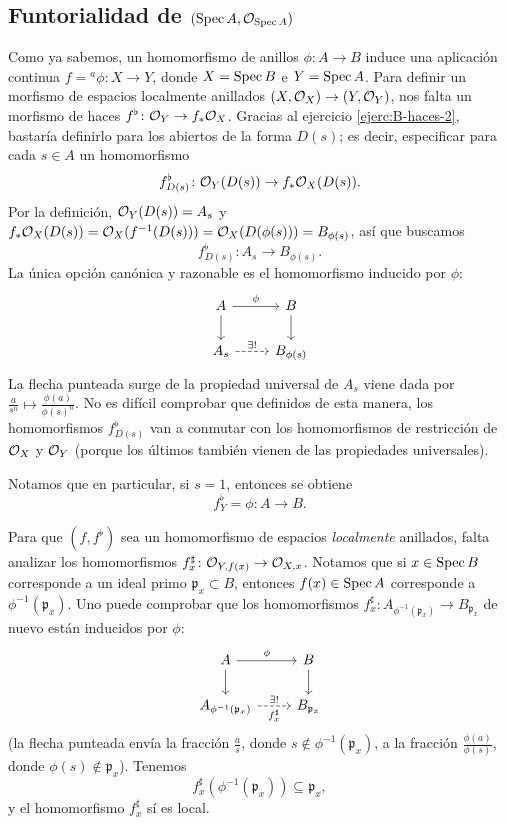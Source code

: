 \documentclass{article}
\numberwithin{equation}{section}
\theoremstyle{definition}
\begin{document}
\subsection{Funtorialidad de $(\operatorname{Spec} A, \mathcal{O}_{\operatorname{Spec} A})$}

Como ya sabemos, un homomorfismo de anillos $\phi\colon A\to B$ induce una
aplicación continua $f = {}^a \phi\colon X\to Y$, donde $X = \operatorname{Spec} B$ e
$Y = \operatorname{Spec} A$. Para definir un morfismo de espacios localmente anillados
$(X,\mathcal{O}_X) \to (Y,\mathcal{O}_Y)$, nos falta un morfismo de haces
$f^\flat\colon \mathcal{O}_Y \to f_* \mathcal{O}_X$. Gracias al ejercicio \ref{ejerc:B-haces-2},
bastaría definirlo para los abiertos de la forma $D (s)$; es decir, especificar
para cada $s \in A$ un homomorfismo
$$f^\flat_{D (s)}\colon \mathcal{O}_Y (D (s)) \to f_* \mathcal{O}_X (D (s)).$$
Por la definición, $\mathcal{O}_Y (D (s)) = A_s$ y
$f_* \mathcal{O}_X (D (s)) = \mathcal{O}_X (f^{-1} (D (s))) = \mathcal{O}_X (D (\phi (s))) = B_{\phi (s)}$,
así que buscamos
$$f^\flat_{D (s)}\colon A_s \to B_{\phi (s)}.$$
La única opción canónica y razonable es el homomorfismo inducido por $\phi$:
\[ \begin{tikzcd}
    A \ar{r}{\phi}\ar{d} & B\ar{d} \\
    A_s \ar[dashed]{r}{\exists!} & B_{\phi (s)}
\end{tikzcd} \]
La flecha punteada surge de la propiedad universal de $A_s$ viene dada por
$\frac{a}{s^n} \mapsto \frac{\phi (a)}{\phi (s)^n}$. No es difícil comprobar
que definidos de esta manera, los homomorfismos $f^\flat_{D (s)}$ van a conmutar
con los homomorfismos de restricción de $\mathcal{O}_X$ y $\mathcal{O}_Y$ (porque los últimos
también vienen de las propiedades universales).

Notamos que en particular, si $s = 1$, entonces se obtiene
\begin{equation}
  \label{eqn:secciones-globales-morfismo}
  f^\flat_Y = \phi\colon A \to B.
\end{equation}

Para que $(f,f^\flat)$ sea un homomorfismo de espacios \emph{localmente}
anillados, falta analizar los homomorfismos
$f^\sharp_x\colon \mathcal{O}_{Y,f(x)} \to \mathcal{O}_{X,x}$. Notamos que si $x \in \operatorname{Spec} B$
corresponde a un ideal primo $\mathfrak{p}_x \subset B$, entonces
$f (x) \in \operatorname{Spec} A$ corresponde a $\phi^{-1} (\mathfrak{p}_x)$. Uno puede
comprobar que los homomorfismos
$f^\sharp_x\colon A_{\phi^{-1} (\mathfrak{p}_x)} \to B_{\mathfrak{p}_x}$
de nuevo están inducidos por $\phi$:
\[ \begin{tikzcd}
    A \ar{r}{\phi}\ar{d} & B\ar{d} \\
    A_{\phi^{-1} (\mathfrak{p}_x)} \ar[dashed]{r}{\exists!}[swap]{f^\sharp_x} & B_{\mathfrak{p}_x}
  \end{tikzcd} \]
(la flecha punteada envía la fracción $\frac{a}{s}$, donde
$s \notin \phi^{-1} (\mathfrak{p}_x)$, a la fracción
$\frac{\phi (a)}{\phi (s)}$, donde $\phi (s) \notin \mathfrak{p}_x$).
Tenemos
$$f^\sharp_x (\phi^{-1} (\mathfrak{p}_x)) \subseteq \mathfrak{p}_x,$$
y el homomorfismo $f^\sharp_x$ sí es local.
\end{document}
